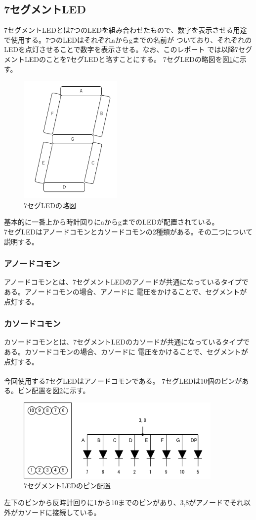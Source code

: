\documentclass[a4paper,11pt,dvipdfmx]{jsarticle}
\begin{document}
\subsection{7セグメントLED}
7セグメントLEDとは7つのLEDを組み合わせたもので、数字を表示させる用途で使用する。7つのLEDはそれぞれaからgまでの名前が
ついており、それぞれのLEDを点灯させることで数字を表示させる。なお、このレポート
では以降7セグメントLEDのことを7セグLEDと略すことにする。
7セグLEDの略図を図\ref{fig:7seg}に示す。
\begin{figure}[H]
  \centering
  \includegraphics[width=5cm]{./images/7seg.png}
  \caption{7セグLEDの略図}
  \label{fig:7seg}
\end{figure}
基本的に一番上から時計回りにaからgまでのLEDが配置されている。\\
7セグLEDはアノードコモンとカソードコモンの2種類がある。その二つについて説明する。
\subsubsection{アノードコモン}
\label{sec:anode}
アノードコモンとは、7セグメントLEDのアノードが共通になっているタイプである。アノードコモンの場合、アノードに
電圧をかけることで、セグメントが点灯する。

\subsubsection{カソードコモン}
カソードコモンとは、7セグメントLEDのカソードが共通になっているタイプである。カソードコモンの場合、カソードに
電圧をかけることで、セグメントが点灯する。
\\\\
今回使用する7セグLEDはアノードコモンである。
7セグLEDは10個のピンがある。ピン配置を図\ref{fig:7segpin}に示す。
\begin{figure}[H]
  \centering
  \includegraphics[width=10cm]{./images/7segpin.png}
  \caption{7セグメントLEDのピン配置}
  \label{fig:7segpin}
\end{figure}
左下のピンから反時計回りに1から10までのピンがあり、3,8がアノードでそれ以外がカソードに接続している。
\end{document}
